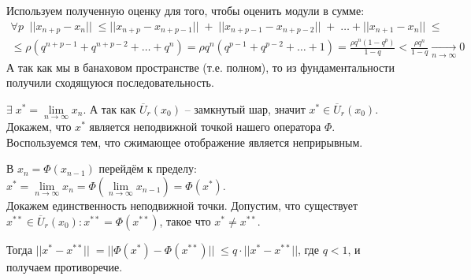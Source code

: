 Используем полученную оценку для того, чтобы оценить модули в сумме:
\begin{align*}
    \forall p \;\; ||x_{n+p} - x_n||\; \leqslant ||x_{n+p} - x_{n+p-1}|| \;+\; ||x_{n+p-1} - x_{n+p-2}|| \;+ \;\ldots + ||x_{n+1} - x_n||\; \leqslant \\ 
    \leqslant \rho (q^{n+p-1} + q^{n+p-2} + \dots + q^n) = \rho q^n (q^{p-1} + q^{p-2} + \dots + 1) = \frac{\rho q^n(1-q^p)}{1-q} < \frac{\rho q^n}{1 - q} \xrightarrow[n\to\infty]{}0
\end{align*}
А так как мы в банаховом пространстве (т.е. полном), то из фундаментальности получили сходящуюся последовательность.

$\exists \;x^* = \lim \limits_{n \rightarrow \infty} x_n$. А так как $\overline{U}_r (x_0)$ -- замкнутый шар, значит $x^* \in \overline{U}_r (x_0)$.
\\
Докажем, что $x^*$ является неподвижной точкой нашего оператора $\Phi$. Воспользуемся тем, что сжимающее отображение является неприрывным.

В $x_n = \Phi(x_{n-1})$ перейдём к пределу: $x^* = \lim \limits_{n \rightarrow \infty} x_n = \Phi(\lim \limits_{n \rightarrow \infty} x_{n-1}) = \Phi(x^*)$.
\\
Докажем единственность неподвижной точки.
Допустим, что существует $x^{**} \in \overline{U}_r (x_0): x^{**}= \Phi(x^{**})$, такое что $x^* \neq x^{**}$.

Тогда $||{x^* - x^{**}}|| \;=||\Phi(x^*) - \Phi(x^{**})|| \;\leqslant q\cdot ||x^* - x^{**}||$, где $q<1$, и получаем противоречие. \EndProof


